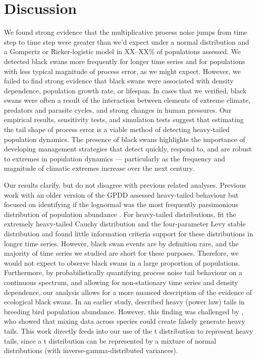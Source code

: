 \section{Discussion}

We found strong evidence that the multiplicative process noise jumps from time step to time step were greater than we'd expect under a normal distribution and a Gompertz or Ricker-logistic model in XX--XX\% of populations assessed. We detected black swans more frequently for longer time series and for populations with less typical magnitude of process error, as we might expect. However, we failed to find strong evidence that black swans were associated with density dependence, population growth rate, or lifespan. In cases that we verified, black swans were often a result of the interaction between elements of extreme climate, predators and parasite cycles, and strong changes in human pressures. Our empirical results, sensitivity tests, and simulation tests suggest that estimating the tail shape of process error is a viable method of detecting heavy-tailed population dynamics. The presence of black swans highlights the importance of developing management strategies that detect quickly, respond to, and are robust to extremes in population dynamics --- particularly as the frequency and magnitude of climatic extremes increase over the next century.

Our results clarify, but do not disagree with previous related analyses. Previous work with an older version of the GPDD assessed heavy-tailed behaviour but focused on identifying if the lognormal was the most frequently parsimonious distribution of population abundance \citep{halley2002}. For heavy-tailed distributions, \citet{halley2002} fit the extremely heavy-tailed Cauchy distribution and the four-parameter Levy stable distribution and found little information criteria support for these distributions in longer time series. However, black swan events are by definition rare, and the majority of time series we studied are short for these purposes. Therefore, we would not expect to observe black swans in a large proportion of populations. Furthermore, by probabilistically quantifying process noise tail behaviour on a continuous spectrum, and allowing for non-stationary time series and density dependence, our analysis allows for a more nuanced description of the evidence of ecological black swans. In an earlier study, \citet{keitt1998} described heavy (power law) tails in breeding bird population abundance. However, this finding was challenged by \citet{allen2001}, who showed that mixing data across species could create falsely generate heavy tails. This work directly feeds into our use of the t distribution to represent heavy tails, since a t distribution can be represented by a mixture of normal distributions (with inverse-gamma-distributed variances).

